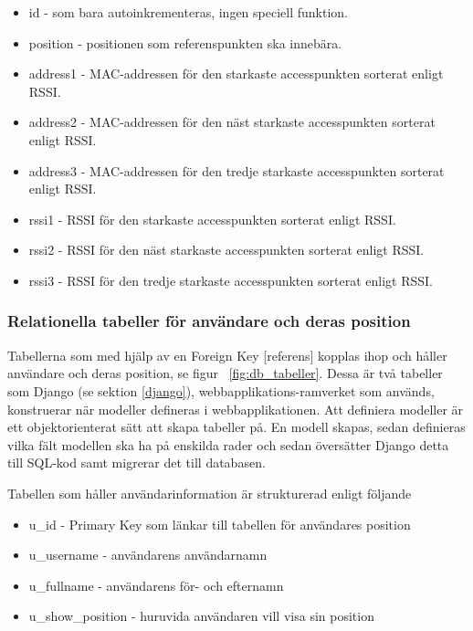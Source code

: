 \documentclass[swedish, a4paper,12pt]{article}
\begin{document}
\begin{itemize}
  \item id - som bara autoinkrementeras, ingen speciell funktion.
  \item position - positionen som referenspunkten ska innebära.
  \item address1 - MAC-addressen för den starkaste accesspunkten sorterat enligt RSSI.
  \item address2 - MAC-addressen för den näst starkaste accesspunkten sorterat enligt RSSI.
  \item address3 - MAC-addressen för den tredje starkaste accesspunkten sorterat enligt RSSI.
  \item rssi1 - RSSI för den starkaste accesspunkten sorterat enligt RSSI.
  \item rssi2 - RSSI för den näst starkaste accesspunkten sorterat enligt RSSI.
  \item rssi3 - RSSI för den tredje starkaste accesspunkten sorterat enligt RSSI.
\end{itemize}

\subsubsection{Relationella tabeller för användare och deras position}
Tabellerna som med hjälp av en Foreign Key [referens]%
kopplas ihop och håller användare och deras position, se figur ~\ref{fig:db_tabeller}.
Dessa är två tabeller som Django (se sektion \ref{django}), webbapplikations-ramverket som används, konstruerar när modeller defineras i webbapplikationen. Att definiera modeller är ett objektorienterat sätt att skapa tabeller på. En modell skapas, sedan definieras vilka fält modellen ska ha på enskilda rader och sedan översätter Django detta till SQL-kod samt migrerar det till databasen.

Tabellen som håller användarinformation är strukturerad enligt följande
\begin{itemize}
  \item  u\_id - Primary Key som länkar till tabellen för användares position %
  \item  u\_username - användarens användarnamn
  \item  u\_fullname - användarens för- och efternamn
  \item  u\_show\_position - huruvida användaren vill visa sin position
\end{itemize}
\end{document}
